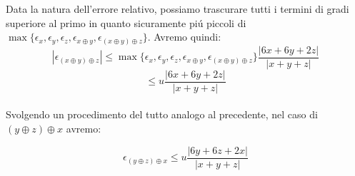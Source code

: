 \noindent Data la natura dell'errore relativo, possiamo trascurare tutti i termini di gradi superiore al primo in quanto sicuramente pi\'u piccoli di \(\max \{\epsilon_x, \epsilon_y, \epsilon_z, \epsilon_{x \oplus y}, \epsilon_{(x \oplus y) \oplus z}\} \). Avremo quindi:
\[
|\epsilon_{(x \oplus y) \oplus z }| \leq \max \{\epsilon_x, \epsilon_y, \epsilon_z, \epsilon_{x \oplus y}, \epsilon_{(x \oplus y) \oplus z}\} \frac{|6x + 6y + 2z|}{|x+y+z|}
\]
\[
\leq u \frac{|6x + 6y + 2z|}{|x+y+z|}
\]
\\
\noindent Svolgendo un procedimento del tutto analogo al precedente, nel caso di \((y \oplus z) \oplus x \) avremo:

\[
\epsilon_{(y \oplus z) \oplus x } \leq u \frac{|6y + 6z + 2x|}{|x+y+z|}
\]
